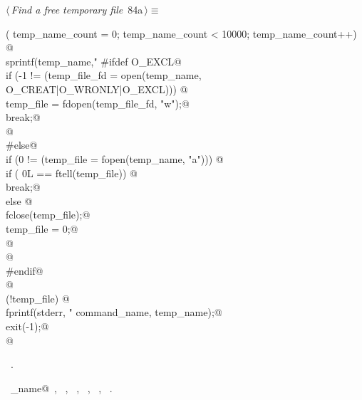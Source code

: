 \documentclass[a4paper]{report}
\begin{document}
\begin{flushleft} \small
\begin{minipage}{\linewidth}\label{scrap172}\raggedright\small
{} $\langle\,${\it Find a free temporary file}\nobreak\ {\footnotesize {84a}}$\,\rangle\equiv$
\vspace{-1ex}
\begin{list}{}{} \item
\mbox{}\verb@for( temp_name_count = 0; temp_name_count < 10000; temp_name_count++) {@\\
\mbox{}\verb@  sprintf(temp_name,"%s%snw%06d", dirpath, path_sep, temp_name_count);@\\
\mbox{}\verb@#ifdef O_EXCL@\\
\mbox{}\verb@  if (-1 != (temp_file_fd = open(temp_name, O_CREAT|O_WRONLY|O_EXCL))) {@\\
\mbox{}\verb@     temp_file = fdopen(temp_file_fd, "w");@\\
\mbox{}\verb@     break;@\\
\mbox{}\verb@  }@\\
\mbox{}\verb@#else@\\
\mbox{}\verb@  if (0 != (temp_file = fopen(temp_name, "a"))) {@\\
\mbox{}\verb@     if ( 0L == ftell(temp_file)) {@\\
\mbox{}\verb@        break;@\\
\mbox{}\verb@     } else {@\\
\mbox{}\verb@        fclose(temp_file);@\\
\mbox{}\verb@        temp_file = 0;@\\
\mbox{}\verb@     }@\\
\mbox{}\verb@  }@\\
\mbox{}\verb@#endif@\\
\mbox{}\verb@}@\\
\mbox{}\verb@if (!temp_file) {@\\
\mbox{}\verb@  fprintf(stderr, "%s: can't create %s for a temporary file\n",@\\
\mbox{}\verb@          command_name, temp_name);@\\
\mbox{}\verb@  exit(-1);@\\
\mbox{}\verb@}@\\
\mbox{}\verb@@{\NWsep}
\end{list}
\vspace{-1.5ex}
\footnotesize
\begin{list}{}{\setlength{\itemsep}{-\parsep}\setlength{\itemindent}{-\leftmargin}}
\item \NWtxtMacroRefIn\ .
\item \NWtxtIdentsUsed\nobreak\  \verb@command_name@\nobreak\ , \verb@exit@\nobreak\ , \verb@fclose@\nobreak\ , \verb@fopen@\nobreak\ , \verb@fprintf@\nobreak\ , \verb@stderr@\nobreak\ .
\item{}
\end{list}
\end{minipage}\vspace{4ex}
\end{flushleft}
\end{document}
